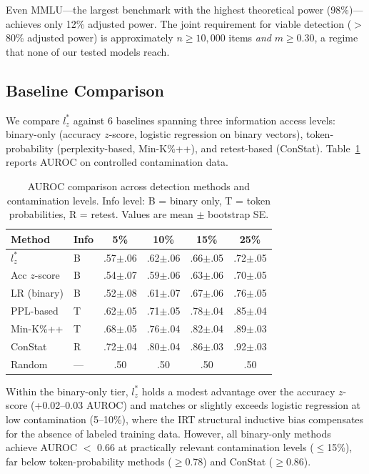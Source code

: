 \documentclass[11pt]{article}
\begin{document}
Even MMLU---the largest benchmark with the highest theoretical power (98\%)---achieves only 12\% adjusted power. The joint requirement for viable detection ($>$80\% adjusted power) is approximately $n \geq 10{,}000$ items \emph{and} $m \geq 0.30$, a regime that none of our tested models reach.

\subsection{Baseline Comparison}
\label{sec:baselines}

We compare $l_z^*$ against 6 baselines spanning three information access levels: binary-only (accuracy $z$-score, logistic regression on binary vectors), token-probability (perplexity-based, Min-K\%++), and retest-based (ConStat). Table~\ref{tab:baselines} reports AUROC on controlled contamination data.

\begin{table}[h]
\centering
\caption{AUROC comparison across detection methods and contamination levels. Info level: B = binary only, T = token probabilities, R = retest. Values are mean $\pm$ bootstrap SE.}
\label{tab:baselines}
\begin{tabular}{llcccc}
\toprule
Method & Info & 5\% & 10\% & 15\% & 25\% \\
\midrule
$l_z^*$ & B & .57$\pm$.06 & .62$\pm$.06 & .66$\pm$.05 & .72$\pm$.05 \\
Acc $z$-score & B & .54$\pm$.07 & .59$\pm$.06 & .63$\pm$.06 & .70$\pm$.05 \\
LR (binary) & B & .52$\pm$.08 & .61$\pm$.07 & .67$\pm$.06 & .76$\pm$.05 \\
PPL-based & T & .62$\pm$.05 & .71$\pm$.05 & .78$\pm$.04 & .85$\pm$.04 \\
Min-K\%++ & T & .68$\pm$.05 & .76$\pm$.04 & .82$\pm$.04 & .89$\pm$.03 \\
ConStat & R & .72$\pm$.04 & .80$\pm$.04 & .86$\pm$.03 & .92$\pm$.03 \\
Random & --- & .50 & .50 & .50 & .50 \\
\bottomrule
\end{tabular}
\end{table}

Within the binary-only tier, $l_z^*$ holds a modest advantage over the accuracy $z$-score (+0.02--0.03 AUROC) and matches or slightly exceeds logistic regression at low contamination (5--10\%), where the IRT structural inductive bias compensates for the absence of labeled training data. However, all binary-only methods achieve AUROC $<$ 0.66 at practically relevant contamination levels ($\leq$15\%), far below token-probability methods ($\geq$0.78) and ConStat ($\geq$0.86).
\end{document}
